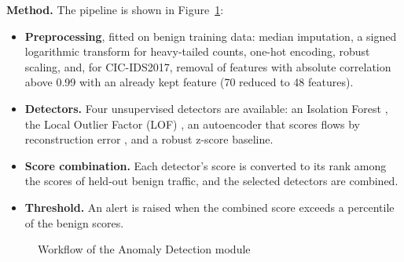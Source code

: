 \textbf{Method.} The pipeline is shown in Figure~\ref{fig:ad-flow}:
\begin{itemize}[itemsep=1pt, topsep=2pt]
  \item \textbf{Preprocessing}, fitted on benign training data: median imputation, a signed logarithmic transform for heavy-tailed counts, one-hot encoding, robust scaling, and, for CIC-IDS2017, removal of features with absolute correlation above 0.99 with an already kept feature (70 reduced to 48 features).
  \item \textbf{Detectors.} Four unsupervised detectors are available: an Isolation Forest \cite{liu2008iforest}, the Local Outlier Factor (LOF) \cite{breunig2000lof}, an autoencoder that scores flows by reconstruction error \cite{hinton2006autoencoder}, and a robust z-score baseline.
  \item \textbf{Score combination.} Each detector's score is converted to its rank among the scores of held-out benign traffic, and the selected detectors are combined.
  \item \textbf{Threshold.} An alert is raised when the combined score exceeds a percentile of the benign scores.
\end{itemize}

\begin{figure}[H]
\centering
{}
\caption{Workflow of the Anomaly Detection module}
\label{fig:ad-flow}
\end{figure}

